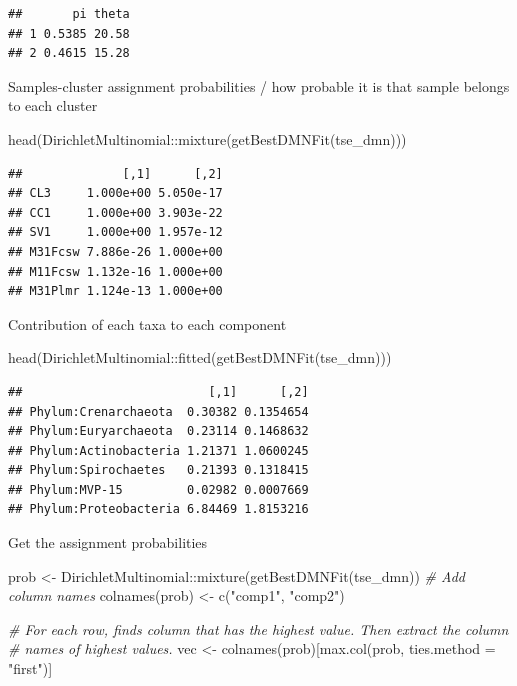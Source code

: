 \documentclass[
]{book}
\newenvironment{Shaded}{\begin{snugshade}}{\end{snugshade}}
\newcommand{\AttributeTok}[1]{\textcolor[rgb]{0.77,0.63,0.00}{#1}}
\newcommand{\CommentTok}[1]{\textcolor[rgb]{0.56,0.35,0.01}{\textit{#1}}}
\newcommand{\FunctionTok}[1]{\textcolor[rgb]{0.00,0.00,0.00}{#1}}
\newcommand{\NormalTok}[1]{#1}
\newcommand{\OtherTok}[1]{\textcolor[rgb]{0.56,0.35,0.01}{#1}}
\newcommand{\SpecialCharTok}[1]{\textcolor[rgb]{0.00,0.00,0.00}{#1}}
\newcommand{\StringTok}[1]{\textcolor[rgb]{0.31,0.60,0.02}{#1}}
\begin{document}
\begin{verbatim}
##       pi theta
## 1 0.5385 20.58
## 2 0.4615 15.28
\end{verbatim}

Samples-cluster assignment probabilities / how probable it is that sample belongs
to each cluster

\begin{Shaded}
\begin{Highlighting}[]
\FunctionTok{head}\NormalTok{(DirichletMultinomial}\SpecialCharTok{::}\FunctionTok{mixture}\NormalTok{(}\FunctionTok{getBestDMNFit}\NormalTok{(tse\_dmn)))}
\end{Highlighting}
\end{Shaded}

\begin{verbatim}
##              [,1]      [,2]
## CL3     1.000e+00 5.050e-17
## CC1     1.000e+00 3.903e-22
## SV1     1.000e+00 1.957e-12
## M31Fcsw 7.886e-26 1.000e+00
## M11Fcsw 1.132e-16 1.000e+00
## M31Plmr 1.124e-13 1.000e+00
\end{verbatim}

Contribution of each taxa to each component

\begin{Shaded}
\begin{Highlighting}[]
\FunctionTok{head}\NormalTok{(DirichletMultinomial}\SpecialCharTok{::}\FunctionTok{fitted}\NormalTok{(}\FunctionTok{getBestDMNFit}\NormalTok{(tse\_dmn)))}
\end{Highlighting}
\end{Shaded}

\begin{verbatim}
##                          [,1]      [,2]
## Phylum:Crenarchaeota  0.30382 0.1354654
## Phylum:Euryarchaeota  0.23114 0.1468632
## Phylum:Actinobacteria 1.21371 1.0600245
## Phylum:Spirochaetes   0.21393 0.1318415
## Phylum:MVP-15         0.02982 0.0007669
## Phylum:Proteobacteria 6.84469 1.8153216
\end{verbatim}

Get the assignment probabilities

\begin{Shaded}
\begin{Highlighting}[]
\NormalTok{prob }\OtherTok{\textless{}{-}}\NormalTok{ DirichletMultinomial}\SpecialCharTok{::}\FunctionTok{mixture}\NormalTok{(}\FunctionTok{getBestDMNFit}\NormalTok{(tse\_dmn))}
\CommentTok{\# Add column names}
\FunctionTok{colnames}\NormalTok{(prob) }\OtherTok{\textless{}{-}} \FunctionTok{c}\NormalTok{(}\StringTok{"comp1"}\NormalTok{, }\StringTok{"comp2"}\NormalTok{)}

\CommentTok{\# For each row, finds column that has the highest value. Then extract the column}
\CommentTok{\# names of highest values.}
\NormalTok{vec }\OtherTok{\textless{}{-}} \FunctionTok{colnames}\NormalTok{(prob)[}\FunctionTok{max.col}\NormalTok{(prob, }\AttributeTok{ties.method =} \StringTok{"first"}\NormalTok{)]}
\end{Highlighting}
\end{Shaded}
\end{document}
